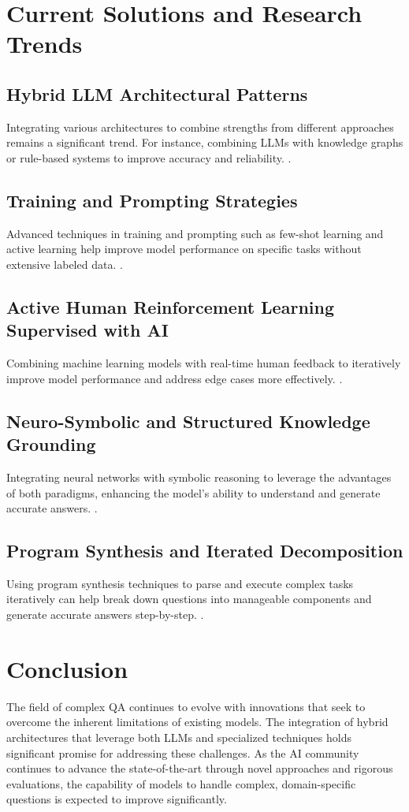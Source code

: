 \documentclass{article}
\begin{document}
\section{Current Solutions and Research Trends}

\subsection{Hybrid LLM Architectural Patterns}
Integrating various architectures to combine strengths from different approaches remains a significant trend. For instance, combining LLMs with knowledge graphs or rule-based systems to improve accuracy and reliability.
\citep{HybridModels2020}.

\subsection{Training and Prompting Strategies}
Advanced techniques in training and prompting such as few-shot learning and active learning help improve model performance on specific tasks without extensive labeled data.
\citep{PromptingSurvey2021}.

\subsection{Active Human Reinforcement Learning Supervised with AI}
Combining machine learning models with real-time human feedback to iteratively improve model performance and address edge cases more effectively.
\citep{HumanInLoopAI2020}.

\subsection{Neuro-Symbolic and Structured Knowledge Grounding}
Integrating neural networks with symbolic reasoning to leverage the advantages of both paradigms, enhancing the model's ability to understand and generate accurate answers.
\citep{NeuroSymbolicAI2021}.

\subsection{Program Synthesis and Iterated Decomposition}
Using program synthesis techniques to parse and execute complex tasks iteratively can help break down questions into manageable components and generate accurate answers step-by-step.
\citep{ProgramSynthesis2019}.

\section{Conclusion}
The field of complex QA continues to evolve with innovations that seek to overcome the inherent limitations of existing models. The integration of hybrid architectures that leverage both LLMs and specialized techniques holds significant promise for addressing these challenges. As the AI community continues to advance the state-of-the-art through novel approaches and rigorous evaluations, the capability of models to handle complex, domain-specific questions is expected to improve significantly.



\end{document}
